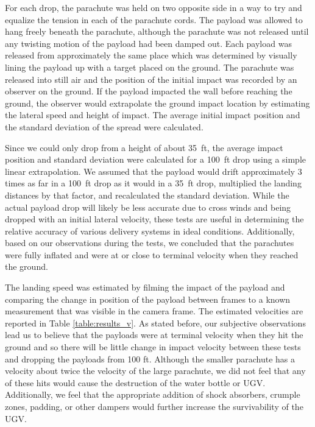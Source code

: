 \documentclass[]{auvsi_doc}
\begin{document}
For each drop, the parachute was held on two opposite side in a way to try and equalize the tension in each of the parachute cords. The payload was allowed to hang freely beneath the parachute, although the parachute was not released until any twisting motion of the payload had been damped out. Each payload was released from approximately the same place which was determined by visually lining the payload up with a target placed on the ground. The parachute was released into still air and the position of the initial impact was recorded by an observer on the ground. If the payload impacted the wall before reaching the ground, the observer would extrapolate the ground impact location by estimating the lateral speed and height of impact. The average initial impact position and the standard deviation of the spread were calculated. 

Since we could only drop from a height of about 35~ft, the average impact position and standard deviation were calculated for a 100~ft drop using a simple linear extrapolation. We assumed that the payload would drift approximately 3 times as far in a 100~ft drop as it would in a 35~ft drop,  multiplied the landing distances by that factor, and recalculated the standard deviation. While the actual payload drop will likely be less accurate due to cross winds and being dropped with an initial lateral velocity, these tests are useful in determining the relative accuracy of various delivery systems in ideal conditions. Additionally, based on our observations during the tests, we concluded that the parachutes were fully inflated and were at or close to terminal velocity when they reached the ground. 

The landing speed was estimated by filming the impact of the payload and comparing the change in position of the payload between frames to a known measurement that was visible in the camera frame. The estimated velocities are reported in Table \ref{table:results_v}. As stated before, our subjective observations lead us to believe that the payloads were at terminal velocity when they hit the ground and so there will be little change in impact velocity between these tests and dropping the payloads from 100 ft. Although the smaller parachute has a velocity about twice the velocity of the large parachute, we did not feel that any of these hits would cause the destruction of the water bottle or UGV. Additionally, we feel that the appropriate addition of shock absorbers, crumple zones, padding, or other dampers would further increase the survivability of the UGV.
\end{document}
